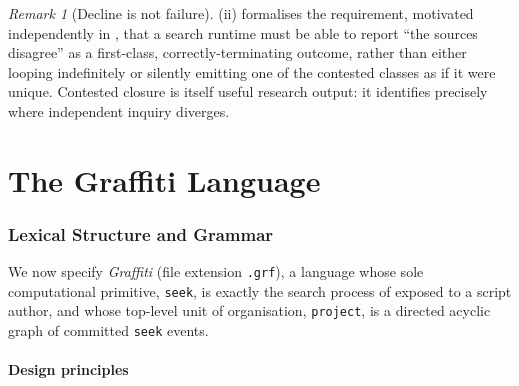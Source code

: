\documentclass[11pt,twocolumn,a4paper]{article}
\theoremstyle{thmstyle}
\theoremstyle{definition}
\theoremstyle{remark}
\newtheorem{remark}[theorem]{Remark}
\begin{document}
\begin{remark}[Decline is not failure]
\label{rem:decline-not-failure}
(ii) formalises the requirement, motivated independently
in , that a search runtime must be able to report
``the sources disagree'' as a first-class, correctly-terminating outcome,
rather than either looping indefinitely or silently emitting one of the
contested classes as if it were unique. Contested closure is itself useful
research output: it identifies precisely where independent inquiry
diverges.
\end{remark}

\part{The Graffiti Language}

\section{Lexical Structure and Grammar}
\label{sec:language}

We now specify \emph{Graffiti} (file extension \texttt{.grf}), a language
whose sole computational primitive, \texttt{seek}, is exactly the search
process of  exposed to a script
author, and whose top-level unit of organisation, \texttt{project}, is a
directed acyclic graph of committed \texttt{seek} events.

\subsection{Design principles}
\end{document}
